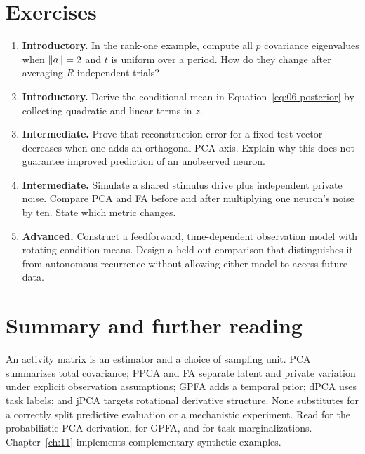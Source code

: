 \section{Exercises}
\begin{enumerate}
\item \textbf{Introductory.} In the rank-one example, compute all $p$ covariance eigenvalues when $\left\lVert a\right\rVert=2$ and $t$ is uniform over a period. How do they change after averaging $R$ independent trials?
\item \textbf{Introductory.} Derive the conditional mean in Equation~\eqref{eq:06-posterior} by collecting quadratic and linear terms in $z$.
\item \textbf{Intermediate.} Prove that reconstruction error for a fixed test vector decreases when one adds an orthogonal PCA axis. Explain why this does not guarantee improved prediction of an unobserved neuron.
\item \textbf{Intermediate.} Simulate a shared stimulus drive plus independent private noise. Compare PCA and FA before and after multiplying one neuron's noise by ten. State which metric changes.
\item \textbf{Advanced.} Construct a feedforward, time-dependent observation model with rotating condition means. Design a held-out comparison that distinguishes it from autonomous recurrence without allowing either model to access future data.
\end{enumerate}

\section{Summary and further reading}
An activity matrix is an estimator and a choice of sampling unit. PCA summarizes total covariance; PPCA and FA separate latent and private variation under explicit observation assumptions; GPFA adds a temporal prior; dPCA uses task labels; and jPCA targets rotational derivative structure. None substitutes for a correctly split predictive evaluation or a mechanistic experiment. Read \citet{app_tipping1999} for the probabilistic PCA derivation, \citet{app_yu2009} for GPFA, and \citet{app_kobak2016} for task marginalizations. Chapter~\ref{ch:11} implements complementary synthetic examples.
